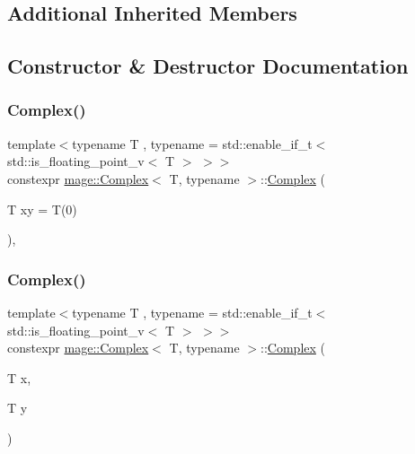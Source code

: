 \subsection*{Additional Inherited Members}


\subsection{Constructor \& Destructor Documentation}
\mbox{\label{structmage_1_1_complex_ad790939a1d1b5718b5c01136264e676f}} 
\subsubsection{\texorpdfstring{Complex()}{Complex()}\hspace{0.1cm}{\footnotesize\ttfamily [1/5]}}
{\footnotesize\ttfamily template$<$typename T , typename  = std\+::enable\+\_\+if\+\_\+t$<$ std\+::is\+\_\+floating\+\_\+point\+\_\+v$<$ T $>$ $>$$>$ \\
constexpr \mbox{\hyperlink{structmage_1_1_complex}{mage\+::\+Complex}}$<$ T, typename $>$\+::\mbox{\hyperlink{structmage_1_1_complex}{Complex}} (\begin{DoxyParamCaption}\item[{T}]{xy = {\ttfamily T(0)} }\end{DoxyParamCaption})\hspace{0.3cm}{\ttfamily [explicit]}, {\ttfamily [noexcept]}}

\mbox{\label{structmage_1_1_complex_aaf50038b1531797405cbef543679057e}} 
\subsubsection{\texorpdfstring{Complex()}{Complex()}\hspace{0.1cm}{\footnotesize\ttfamily [2/5]}}
{\footnotesize\ttfamily template$<$typename T , typename  = std\+::enable\+\_\+if\+\_\+t$<$ std\+::is\+\_\+floating\+\_\+point\+\_\+v$<$ T $>$ $>$$>$ \\
constexpr \mbox{\hyperlink{structmage_1_1_complex}{mage\+::\+Complex}}$<$ T, typename $>$\+::\mbox{\hyperlink{structmage_1_1_complex}{Complex}} (\begin{DoxyParamCaption}\item[{T}]{x,  }\item[{T}]{y }\end{DoxyParamCaption})\hspace{0.3cm}{\ttfamily [noexcept]}}

